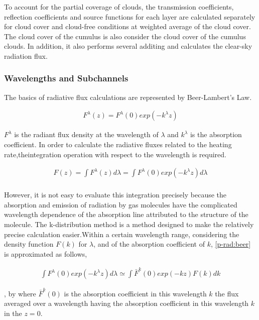 To account for the partial coverage of clouds, the transmission coefficients, 
reflection coefficients and source functions for each layer are calculated 
separately for cloud cover and cloud-free conditions at weighted average of 
the cloud cover. The cloud cover of the cumulus is also consider the cloud 
cover of the cumulus clouds. In addition, it also performs several additing 
and calculates the clear-sky radiation flux.

\hypertarget{wavelengths-and-subchannels}{%
\subsubsection{Wavelengths and
Subchannels}\label{wavelengths-and-subchannels}}

The basics of radiative flux calculations are represented by Beer-Lambert's Law.

\begin{eqnarray}
  F^\lambda(z) = F^\lambda(0) exp (-k^\lambda z)
\end{eqnarray}

\(F^\lambda\) is the radiant flux density at the wavelength of \(\lambda\) and \(k^\lambda\) 
is the absorption coefficient. In order to calculate the radiative fluxes related to the 
heating rate,theintegration operation with respect to the wavelength is required.

\begin{eqnarray}
  F(z) = \int F^\lambda(z) d \lambda 
 = \int F^\lambda(0) exp (-k^\lambda z) d \lambda \label{p-rad:beer}\\
\end{eqnarray}

However, it is not easy to evaluate this integration precisely because the 
absorption and emission of radiation by gas molecules have the complicated 
wavelength dependence of the absorption line attributed to the structure of 
the molecule. The k-distribution method is a method designed to make the 
relatively precise calculation easier.Within a certain wavelength range, 
considering the density function \(F(k)\) for \(\lambda\), and of the 
absorption coefficient of \(k\), \eqref{p-rad:beer} is approximated as follows, 

\begin{eqnarray}
 \int F^\lambda(0) exp (-k^\lambda z) d \lambda 
 \simeq \int \bar{F}^k(0) exp (-k z) F(k) dk
\end{eqnarray}

, by where \(\bar{F}^k(0)\) is  the absorption coefficient in this wavelength \(k\) 
the flux averaged over a wavelength having the absorption coefficient in this 
wavelength \(k\)in the \(z=0\). 

